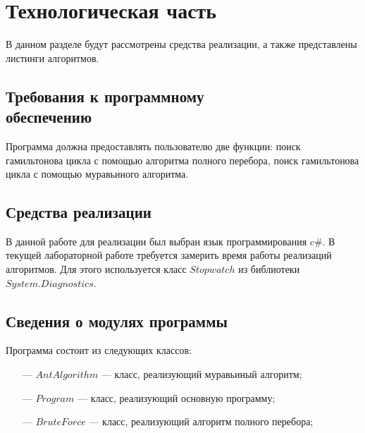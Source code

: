 \chapter{Технологическая часть}
В данном разделе будут рассмотрены средства реализации, а также представлены листинги алгоритмов.
\section[Требования к программному обеспечению]{Требования к программному\\обеспечению }

Программа должна предоставлять пользователю две функции: поиск гамильтонова цикла с помощью алгоритма полного перебора, поиск гамильтонова цикла с помощью муравьиного алгоритма.

\section{Средства реализации}
В данной работе для реализации был выбран язык программирования $c\#$. В текущей лабораторной работе требуется замерить время работы реализаций алгоритмов. Для этого используется класс  $Stopwatch$ из библиотеки $System.Diagnostics$.
\newpage
\section{Сведения о модулях программы}
Программа состоит из следующих классов:
\begin{itemize}[itemindent=1.25em]
	\item[---] $AntAlgorithm$ --- класс, реализующий муравьиный алгоритм; 
	\item[---] $Program$ --- класс, реализующий основную программу;
    \item[---] $BruteForce$ --- класс, реализующий алгоритм полного перебора;
\end{itemize}


